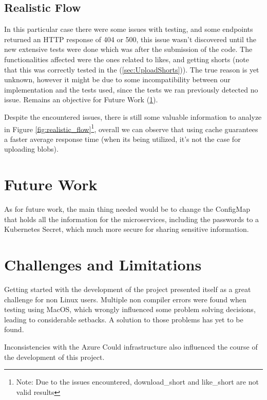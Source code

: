 \documentclass[10pt,a4paper,twocolumn]{article}
\begin{document}
\subsection{Realistic Flow}
\label{sec:realisticFlow}
In this particular case there were some issues with testing, and some endpoints returned an HTTP response of 404 or 500, this issue wasn't discovered until the new extensive tests were done which was after the submission of the code. The functionalities affected were the ones related to likes, and getting shorts (note that this was correctly tested in the (\ref{sec:UploadShorts})). The true reason is yet unknown, however it might be due to some incompatibility between our implementation and the tests used, since the tests we ran previously detected no issue. Remains an objective for Future Work (\ref{sec:FutWork}).
\par Despite the encountered issues, there is still some valuable information to analyze in Figure \ref{fig:realistic_flow}\footnote{Note: Due to the issues encountered, download\_short and like\_short are not valid results}, overall we can observe that using cache guarantees a faster average response time (when its being utilized, it's not the case for uploading blobs).


\section{Future Work}
\label{sec:FutWork}
As for future work, the main thing needed would be to change the ConfigMap that holds all the information for the microservices, including the passwords to a Kubernetes Secret, which much more secure for sharing sensitive information.

\section{Challenges and Limitations}
\label{sec: challengesLimit}
\par Getting started with the development of the project presented itself as a great challenge for non Linux users. Multiple non compiler errors were found when testing using MacOS, which wrongly influenced some problem solving decisions, leading to considerable setbacks. A solution to those problems has yet to be found.
\par Inconsistencies with the Azure Could infrastructure also influenced the course of the development of this project.
\end{document}

